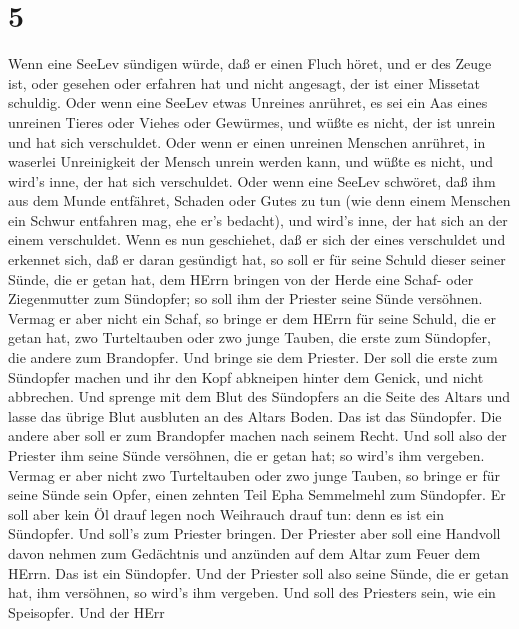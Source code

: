 \hypertarget{section-4}{%
\section{5}\label{section-4}}

 Wenn eine SeeLev sündigen würde, daß er einen Fluch höret,
und er des Zeuge ist, oder gesehen oder erfahren hat und nicht angesagt,
der ist einer Missetat schuldig.  Oder wenn eine SeeLev
etwas Unreines anrühret, es sei ein Aas eines unreinen Tieres oder
Viehes oder Gewürmes, und wüßte es nicht, der ist unrein und hat sich
verschuldet.  Oder wenn er einen unreinen Menschen anrühret,
in waserlei Unreinigkeit der Mensch unrein werden kann, und wüßte es
nicht, und wird's inne, der hat sich verschuldet.  Oder wenn
eine SeeLev schwöret, daß ihm aus dem Munde entfähret, Schaden oder
Gutes zu tun (wie denn einem Menschen ein Schwur entfahren mag, ehe er's
bedacht), und wird's inne, der hat sich an der einem verschuldet.
 Wenn es nun geschiehet, daß er sich der eines verschuldet
und erkennet sich, daß er daran gesündigt hat,  so soll er
für seine Schuld dieser seiner Sünde, die er getan hat, dem HErrn
bringen von der Herde eine Schaf- oder Ziegenmutter zum Sündopfer; so
soll ihm der Priester seine Sünde versöhnen.  Vermag er aber
nicht ein Schaf, so bringe er dem HErrn für seine Schuld, die er getan
hat, zwo Turteltauben oder zwo junge Tauben, die erste zum Sündopfer,
die andere zum Brandopfer.  Und bringe sie dem Priester. Der
soll die erste zum Sündopfer machen und ihr den Kopf abkneipen hinter
dem Genick, und nicht abbrechen.  Und sprenge mit dem Blut
des Sündopfers an die Seite des Altars und lasse das übrige Blut
ausbluten an des Altars Boden. Das ist das Sündopfer.  Die
andere aber soll er zum Brandopfer machen nach seinem Recht. Und soll
also der Priester ihm seine Sünde versöhnen, die er getan hat; so wird's
ihm vergeben.  Vermag er aber nicht zwo Turteltauben oder
zwo junge Tauben, so bringe er für seine Sünde sein Opfer, einen zehnten
Teil Epha Semmelmehl zum Sündopfer. Er soll aber kein Öl drauf legen
noch Weihrauch drauf tun: denn es ist ein Sündopfer.  Und
soll's zum Priester bringen. Der Priester aber soll eine Handvoll davon
nehmen zum Gedächtnis und anzünden auf dem Altar zum Feuer dem HErrn.
Das ist ein Sündopfer.  Und der Priester soll also seine
Sünde, die er getan hat, ihm versöhnen, so wird's ihm vergeben. Und soll
des Priesters sein, wie ein Speisopfer.  Und der HErr
